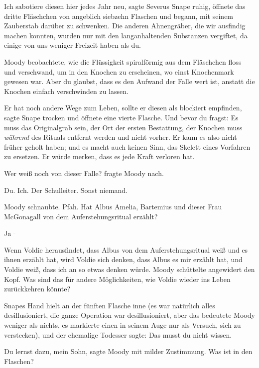 \glqq Ich sabotiere diesen hier jedes Jahr neu\grqq{}, sagte Severus Snape
ruhig, öffnete das dritte Fläschchen von angeblich siebzehn Flaschen und begann,
mit seinem Zauberstab darüber zu schwenken. \glqq Die anderen Ahnengräber, die
wir ausfindig machen konnten, wurden nur mit den langanhaltenden Substanzen
vergiftet, da einige von uns weniger Freizeit haben als du.\grqq{}

Moody beobachtete, wie die Flüssigkeit spiralförmig aus dem Fläschchen floss und
verschwand, um in den Knochen zu erscheinen, wo einst Knochenmark gewesen war.
\glqq Aber du glaubst, dass es den Aufwand der Falle wert ist, anstatt die
Knochen einfach verschwinden zu lassen.\grqq{}

\glqq Er hat noch andere Wege zum Leben, sollte er diesen als blockiert
empfinden\grqq{}, sagte Snape trocken und öffnete eine vierte Flasche. \glqq Und
bevor du fragst: Es muss das Originalgrab sein, der Ort der ersten Bestattung,
der Knochen muss \emph{während} des Rituals entfernt werden und nicht vorher. Er
kann es also nicht früher geholt haben; und es macht auch keinen Sinn, das
Skelett eines Vorfahren zu ersetzen. Er würde merken, dass es jede Kraft
verloren hat.\grqq{}

\glqq Wer weiß noch von dieser Falle?\grqq{} fragte Moody nach.

\glqq Du. Ich. Der Schulleiter. Sonst niemand.\grqq{}

Moody schnaubte. \glqq Pfah. Hat Albus Amelia, Bartemius und dieser Frau
McGonagall von dem Auferstehungsritual erzählt?\grqq{}

\glqq Ja -\grqq{}

\glqq Wenn Voldie herausfindet, dass Albus von dem Auferstehungsritual weiß und
es ihnen erzählt hat, wird Voldie sich denken, dass Albus es mir erzählt hat,
und Voldie weiß, dass ich an so etwas denken würde.\grqq{} Moody schüttelte
angewidert den Kopf. \glqq Was sind das für andere Möglichkeiten, wie Voldie
wieder ins Leben zurückkehren könnte?\grqq{}

Snapes Hand hielt an der fünften Flasche inne (es war natürlich alles
desillusioniert, die ganze Operation war desillusioniert, aber das bedeutete
Moody weniger als nichts, es markierte einen in seinem Auge nur als Versuch,
sich zu verstecken), und der ehemalige Todesser sagte: \glqq Das musst du nicht
wissen.\grqq{}

\glqq Du lernst dazu, mein Sohn\grqq{}, sagte Moody mit milder Zustimmung. \glqq
Was ist in den Flaschen?\grqq{}

